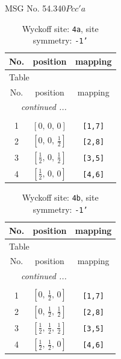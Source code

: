 \documentclass[fleqn,8pt]{jsarticle}
\begin{document}
\setcounter{MaxMatrixCols}{32}

\renewcommand{\tablename}{Table~}
\renewcommand{\figurename}{Figure~}
\begin{center}
\LARGE
MSG No. 54.340\quad$Pcc'a$
\end{center}
\renewcommand{\arraystretch}{1.2}
\begin{longtable}{ccc}
\caption{Wyckoff site: {\tt 4a}, site symmetry: {\tt -1'}}
 \\
 \hline \hline
No. & position & mapping \\ \hline \endfirsthead

\multicolumn{2}{l}{\tablename\ \thetable{}} \\
 \hline \hline
No. & position & mapping \\ \hline \endhead

 \hline \hline
\multicolumn{2}{r}{\footnotesize\it continued ...} \\ \endfoot

 \hline \hline
\multicolumn{2}{r}{} \\ \endlastfoot

1 & $\left[ 0,\, 0,\, 0 \right]$ & {\tt [1,7]} \\ \hline
2 & $\left[ 0,\, 0,\, \frac{1}{2} \right]$ & {\tt [2,8]} \\ \hline
3 & $\left[ \frac{1}{2},\, 0,\, \frac{1}{2} \right]$ & {\tt [3,5]} \\ \hline
4 & $\left[ \frac{1}{2},\, 0,\, 0 \right]$ & {\tt [4,6]} \\
\end{longtable}
\renewcommand{\arraystretch}{1.2}
\begin{longtable}{ccc}
\caption{Wyckoff site: {\tt 4b}, site symmetry: {\tt -1'}}
 \\
 \hline \hline
No. & position & mapping \\ \hline \endfirsthead

\multicolumn{2}{l}{\tablename\ \thetable{}} \\
 \hline \hline
No. & position & mapping \\ \hline \endhead

 \hline \hline
\multicolumn{2}{r}{\footnotesize\it continued ...} \\ \endfoot

 \hline \hline
\multicolumn{2}{r}{} \\ \endlastfoot

1 & $\left[ 0,\, \frac{1}{2},\, 0 \right]$ & {\tt [1,7]} \\ \hline
2 & $\left[ 0,\, \frac{1}{2},\, \frac{1}{2} \right]$ & {\tt [2,8]} \\ \hline
3 & $\left[ \frac{1}{2},\, \frac{1}{2},\, \frac{1}{2} \right]$ & {\tt [3,5]} \\ \hline
4 & $\left[ \frac{1}{2},\, \frac{1}{2},\, 0 \right]$ & {\tt [4,6]} \\
\end{longtable}
\end{document}
